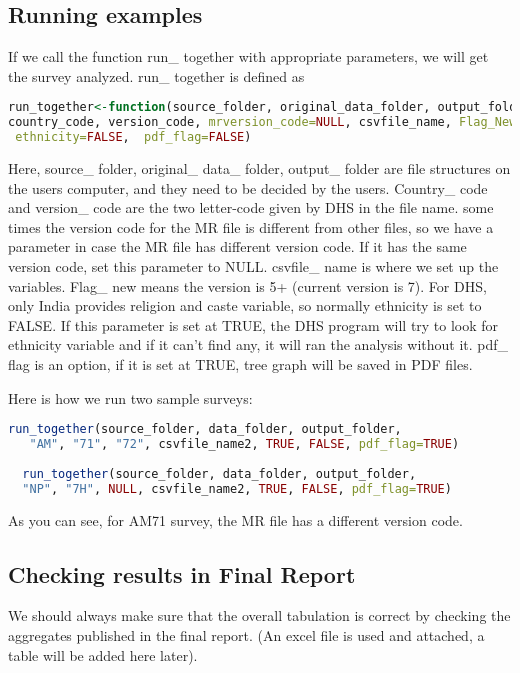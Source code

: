 \documentclass[12pt]{article}
\begin{document}
\subsection{Running examples}
If we call the function run\_ together with appropriate parameters, we will get the survey analyzed.
run\_ together is defined as 
{\small 
  \begin{lstlisting}[language=R]
run_together<-function(source_folder, original_data_folder, output_folder, 
country_code, version_code, mrversion_code=NULL, csvfile_name, Flag_New=TRUE,
 ethnicity=FALSE,  pdf_flag=FALSE)
  \end{lstlisting}  
  }
Here, source\_ folder, original\_ data\_ folder, output\_ folder are file structures on the users computer, and they need to be decided by the users. 
Country\_ code and version\_ code are the two letter-code given by DHS in the file name. some times the version code for the MR file is different from other files, so we have a parameter in case the MR file has different version code. If it has the same version code, set this parameter to NULL. csvfile\_ name is where we set up the variables.  Flag\_ new means the version is 5+ (current version is 7). For DHS, only India provides religion and caste variable, so normally ethnicity is set to FALSE. If this parameter is set at TRUE, the DHS program will try to look for ethnicity variable and if it can't find any, it will ran the analysis without it. pdf\_ flag is an option, if it is set at TRUE, tree graph will be saved in PDF files.

 
Here is how we run two sample surveys:
{\small 
  \begin{lstlisting}[language=R]
   run_together(source_folder, data_folder, output_folder, 
   "AM", "71", "72", csvfile_name2, TRUE, FALSE, pdf_flag=TRUE)
  
  run_together(source_folder, data_folder, output_folder, 
  "NP", "7H", NULL, csvfile_name2, TRUE, FALSE, pdf_flag=TRUE)
 \end{lstlisting}  
} 

As you can see, for AM71 survey, the MR file has a different version code.

\subsection{Checking results in Final Report}

We should always make sure that the overall tabulation is correct by checking the aggregates published in the final report. (An excel file is used and attached, a table will be added here later).
\end{document}

